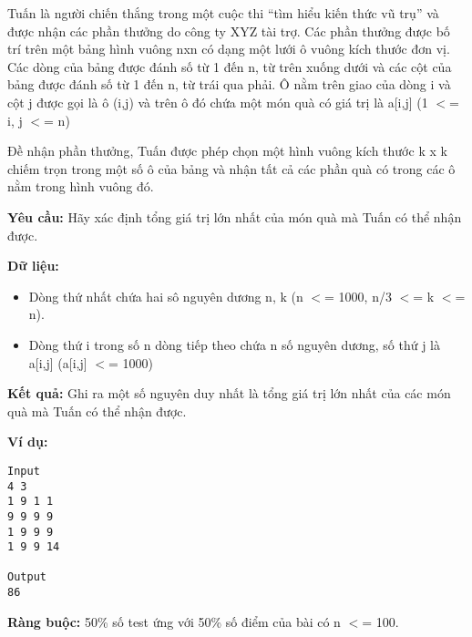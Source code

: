 

Tuấn là người chiến thắng trong một cuộc thi “tìm hiểu kiến thức vũ trụ” và được nhận các phần thưởng do công ty XYZ tài trợ. Các phần thưởng được bố trí trên một bảng hình vuông nxn \emph{} có dạng một lưới ô vuông kích thước đơn vị. Các dòng của bảng được đánh số từ 1 đến n, từ trên xuống dưới và các cột của bảng được đánh số từ 1 đến n, từ trái qua phải. Ô nằm trên giao của dòng i và cột j được gọi là ô (i,j) và trên ô đó chứa một món quà có giá trị là a[i,j] (1 $<$= i, j $<$= n)

Đề nhận phần thưởng, Tuấn được phép chọn một hình vuông kích thước k x k chiếm trọn trong một số ô của bảng và nhận tất cả các phần quà có trong các ô nằm trong hình vuông đó.

\textbf{Yêu cầu: } Hãy xác định tổng giá trị lớn nhất của món quà mà Tuấn có thể nhận được.

\textbf{Dữ liệu: }
\begin{itemize}
	\item Dòng thứ nhất chứa hai sô nguyên dương n, k (n $<$= 1000, n/3 $<$= k $<$= n).
	\item Dòng thứ i trong số n dòng tiếp theo chứa n số nguyên dương, số thứ j là a[i,j] (a[i,j] $<$= 1000)
\end{itemize}

\textbf{Kết quả: } Ghi ra một số nguyên duy nhất là tổng giá trị lớn nhất của các món quà mà Tuấn có thể nhận được.

\textbf{Ví dụ: }
\begin{verbatim}
Input
4 3
1 9 1 1
9 9 9 9
1 9 9 9
1 9 9 14

Output
86\end{verbatim}

\textbf{Ràng buộc: } 50\% số test ứng với 50\% số điểm của bài có n $<$= 100.